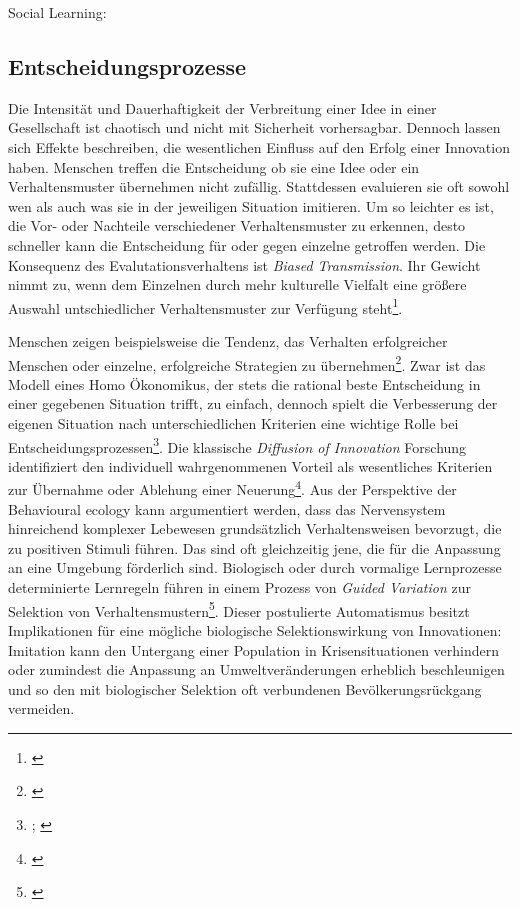\documentclass[openany,twoside,twocolumn]{book}
\let\rmarkdownfootnote\footnote%
\def\footnote{\protect\rmarkdownfootnote}
\begin{document}
Social Learning:
\autocites{arbilly_arms_2014}{enquist_evolution_2007}{rendell_cognitive_2011}{rendell_rogers_2010}

\hypertarget{entscheidungsprozesse}{%
\subsection{Entscheidungsprozesse}\label{entscheidungsprozesse}}

Die Intensität und Dauerhaftigkeit der Verbreitung einer Idee in einer
Gesellschaft ist chaotisch und nicht mit Sicherheit vorhersagbar.
Dennoch lassen sich Effekte beschreiben, die wesentlichen Einfluss auf
den Erfolg einer Innovation haben. Menschen treffen die Entscheidung ob
sie eine Idee oder ein Verhaltensmuster übernehmen nicht zufällig.
Stattdessen evaluieren sie oft sowohl wen als auch was sie in der
jeweiligen Situation imitieren. Um so leichter es ist, die Vor- oder
Nachteile verschiedener Verhaltensmuster zu erkennen, desto schneller
kann die Entscheidung für oder gegen einzelne getroffen werden. Die
Konsequenz des Evalutationsverhaltens ist \emph{Biased Transmission}.
Ihr Gewicht nimmt zu, wenn dem Einzelnen durch mehr kulturelle Vielfalt
eine größere Auswahl untschiedlicher Verhaltensmuster zur Verfügung
steht\footnote{\textcite{smith_cultural_1992}}.

Menschen zeigen beispielsweise die Tendenz, das Verhalten erfolgreicher
Menschen oder einzelne, erfolgreiche Strategien zu übernehmen\footnote{\textcite{henrich_evolution_2003}}.
Zwar ist das Modell eines Homo Ökonomikus, der stets die rational beste
Entscheidung in einer gegebenen Situation trifft, zu einfach, dennoch
spielt die Verbesserung der eigenen Situation nach unterschiedlichen
Kriterien eine wichtige Rolle bei Entscheidungsprozessen\footnote{\textcite{mesoudi_cultural_2008};
  \textcite{mesoudi_experimental_2011}}. Die klassische \emph{Diffusion
of Innovation} Forschung identifiziert den individuell wahrgenommenen
Vorteil als wesentliches Kriterien zur Übernahme oder Ablehung einer
Neuerung\footnote{\textcite{rogers_diffusion_1983}}. Aus der Perspektive
der Behavioural ecology kann argumentiert werden, dass das Nervensystem
hinreichend komplexer Lebewesen grundsätzlich Verhaltensweisen
bevorzugt, die zu positiven Stimuli führen. Das sind oft gleichzeitig
jene, die für die Anpassung an eine Umgebung förderlich sind. Biologisch
oder durch vormalige Lernprozesse determinierte Lernregeln führen in
einem Prozess von \emph{Guided Variation} zur Selektion von
Verhaltensmustern\footnote{\textcite{smith_cultural_1992}}. Dieser
postulierte Automatismus besitzt Implikationen für eine mögliche
biologische Selektionswirkung von Innovationen: Imitation kann den
Untergang einer Population in Krisensituationen verhindern oder
zumindest die Anpassung an Umweltveränderungen erheblich beschleunigen
und so den mit biologischer Selektion oft verbundenen
Bevölkerungsrückgang vermeiden.
\end{document}
